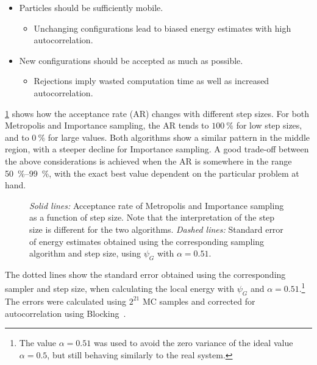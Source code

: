 \documentclass[Thesis.tex]{subfiles}
\begin{document}
\begin{itemize}
\item Particles should be sufficiently mobile.
  \begin{itemize}
  \item Unchanging configurations lead to biased energy estimates with high
    autocorrelation.
  \end{itemize}
\item New configurations should be accepted as much as possible.
  \begin{itemize}
  \item Rejections imply wasted computation time as well as increased autocorrelation.
  \end{itemize}
\end{itemize}


\cref{fig:verify-sampling-step} shows how the acceptance rate (AR) changes with
different step sizes. For both Metropolis and Importance sampling, the AR tends
to $\SI{100}{\percent}$ for low step sizes, and to $\SI{0}{\percent}$ for large
values. Both algorithms show a similar pattern in the middle region, with
a steeper decline for Importance sampling. A good trade-off between the above
considerations is achieved when the AR is somewhere in the range
\SIrange{50}{99}{\percent}, with the exact best value dependent on the
particular problem at hand.

\begin{figure}[h]
  \centering
    \resizebox{\linewidth}{!}{%
      
    }
    \caption[Comparison of sampling strategies]{\label{fig:verify-sampling-step}\emph{Solid lines:} Acceptance rate of
    Metropolis and Importance sampling as a function of step size. Note that the
  interpretation of the step size is different for the two algorithms. \emph{Dashed
  lines:} Standard error of energy estimates obtained using the corresponding
  sampling algorithm and step size, using $\psi_G$ with $\alpha=0.51$.}
\end{figure}


The dotted lines show the standard error obtained using the
corresponding sampler and step size, when calculating the local energy with
$\psi_G$ and $\alpha=0.51$.\footnote{The value $\alpha=0.51$ was used to avoid
  the zero variance of the ideal value $\alpha=0.5$, but still behaving
  similarly to the real system.} The errors were calculated using $2^{21}$ MC
samples and corrected for autocorrelation using Blocking~\cite{Jonsson-2018}.
\end{document}
